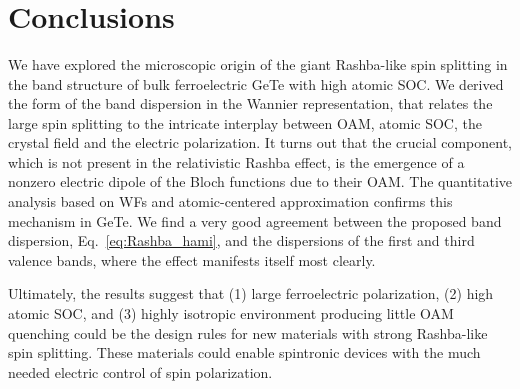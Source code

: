 \begin{figure*}[t!]
  ~
  \\
  ~
  ~
  \\
  ~
  ~
  \caption{\label{fig:Rashba_textures}{\bf OAM and SAM in the BZ.} The textures of BFs around the $Z$ point are shown for the first and third valence bands of GeTe. The black and green arrows show the OAM and SAM textures, respectively. The length of the arrows was chosen separately for clarity in each figure and should thus not be compared. The color maps signify the energy of the bands, relative to the Fermi level. The small box around the $Z$ point indicates the area, magnified in panels (c) and (f). In the zoomed figures (c) and (f) one can observe the change or relative orientation between the SAM and OAM when moving away from the $Z$ point, signifying a change of character between $j=1/2$ and $j=3/2$. Figure taken from Ref.~\cite{Ponet2018}}
\end{figure*}

\section{Conclusions}

We have explored the microscopic origin of the giant Rashba-like spin splitting in the band structure of bulk ferroelectric GeTe with high atomic SOC. We derived the form of the band dispersion in the Wannier representation, that relates the large spin splitting to the intricate interplay between OAM, atomic SOC, the crystal field and the electric polarization. It turns out that the crucial component, which is not present in the relativistic Rashba effect, is the emergence of a nonzero electric dipole of the Bloch functions due to their OAM. The quantitative analysis based on WFs and atomic-centered approximation confirms this mechanism in GeTe. We find a very good agreement between the proposed band dispersion, Eq.~\ref{eq:Rashba_hami}, and the dispersions of the first and third valence bands, where the effect manifests itself most clearly.

Ultimately, the results suggest that (1) large ferroelectric polarization, (2) high atomic SOC, and (3) highly isotropic environment producing little OAM quenching could be the design rules for new materials with strong Rashba-like spin splitting. These materials could enable spintronic devices with the much needed electric control of spin polarization.
